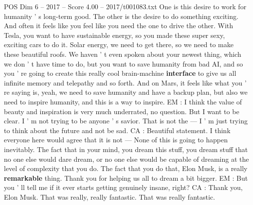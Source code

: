 \begin{textsample}{POS Dim 6 – 2017 – Score 4.00 – 2017/t001083.txt}
One is this desire to work for humanity ' s long-term good.
The other is the desire to do something exciting.
And often it feels like you feel like you need the one to drive the other.
With Tesla, you want to have sustainable energy, so you made these super sexy, exciting cars to do it.
Solar energy, we need to get there, so we need to make these beautiful roofs.
We haven ' t even spoken about your newest thing, which we don ' t have time to do, but you want to save humanity from bad AI, and so you ' re going to create this really cool brain-machine \textbf{interface} to give us all infinite memory and telepathy and so forth.
And on Mars, it feels like what you ' re saying is, yeah, we need to save humanity and have a backup plan, but also we need to inspire humanity, and this is a way to inspire.
EM : I think the value of beauty and inspiration is very much underrated, no question.
But I want to be clear.
I ' m not trying to be anyone ' s savior.
That is not the — I ' m just trying to think about the future and not be sad.
CA : Beautiful statement.
I think everyone here would agree that it is not — None of this is going to happen inevitably.
The fact that in your mind, you dream this stuff, you dream stuff that no one else would dare dream, or no one else would be capable of dreaming at the level of complexity that you do.
The fact that you do that, Elon Musk, is a really \textbf{remarkable} thing.
Thank you for helping us all to dream a bit bigger.
EM : But you ' ll tell me if it ever starts getting genuinely insane, right?
CA : Thank you, Elon Musk.
That was really, really fantastic.
That was really fantastic.

\end{textsample}
